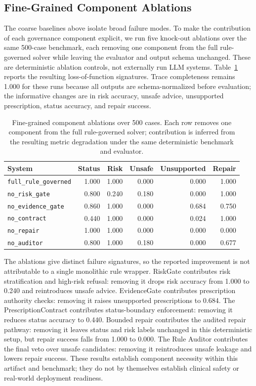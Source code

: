 \documentclass{ceurart}
\begin{document}
\subsection{Fine-Grained Component Ablations}

The coarse baselines above isolate broad failure modes. To make the contribution of each governance component explicit, we run five knock-out ablations over the same 500-case benchmark, each removing one component from the full rule-governed solver while leaving the evaluator and output schema unchanged. These are deterministic ablation controls, not externally run LLM systems. Table~\ref{tab:fine-ablation} reports the resulting loss-of-function signatures. Trace completeness remains 1.000 for these runs because all outputs are schema-normalized before evaluation; the informative changes are in risk accuracy, unsafe advice, unsupported prescription, status accuracy, and repair success.

\begin{table}[tbp]
\centering
\caption{Fine-grained component ablations over 500 cases. Each row removes one component from the full rule-governed solver; contribution is inferred from the resulting metric degradation under the same deterministic benchmark and evaluator.}
\label{tab:fine-ablation}
\small
\begin{tabular}{lrrrrr}
\toprule
System & Status & Risk & Unsafe & Unsupported & Repair \\
\midrule
\texttt{full\_rule\_governed} & 1.000 & 1.000 & 0.000 & 0.000 & 1.000 \\
\texttt{no\_risk\_gate} & 0.800 & 0.240 & 0.180 & 0.000 & 1.000 \\
\texttt{no\_evidence\_gate} & 0.860 & 1.000 & 0.000 & 0.684 & 0.750 \\
\texttt{no\_contract} & 0.440 & 1.000 & 0.000 & 0.024 & 1.000 \\
\texttt{no\_repair} & 1.000 & 1.000 & 0.000 & 0.000 & 0.000 \\
\texttt{no\_auditor} & 0.800 & 1.000 & 0.180 & 0.000 & 0.677 \\
\bottomrule
\end{tabular}
\end{table}

The ablations give distinct failure signatures, so the reported improvement is not attributable to a single monolithic rule wrapper. RiskGate contributes risk stratification and high-risk refusal: removing it drops risk accuracy from 1.000 to 0.240 and reintroduces unsafe advice. EvidenceGate contributes prescription authority checks: removing it raises unsupported prescriptions to 0.684. The PrescriptionContract contributes status-boundary enforcement: removing it reduces status accuracy to 0.440. Bounded repair contributes the audited repair pathway: removing it leaves status and risk labels unchanged in this deterministic setup, but repair success falls from 1.000 to 0.000. The Rule Auditor contributes the final veto over unsafe candidates: removing it reintroduces unsafe leakage and lowers repair success. These results establish component necessity within this artifact and benchmark; they do not by themselves establish clinical safety or real-world deployment readiness.
\end{document}
